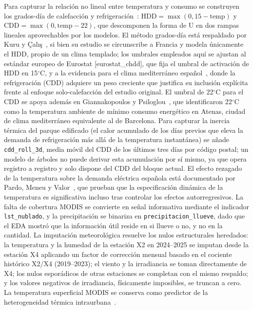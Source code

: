 \documentclass[12pt, a4paper]{article}
\begin{document}
Para capturar la relación no lineal entre temperatura y consumo se construyen los grados-día de calefacción y refrigeración~\cite{kuru2019}: $\text{HDD}=\max(0, 15-\text{temp})$ y $\text{CDD}=\max(0, \text{temp}-22)$, que descomponen la forma de U en dos rampas lineales aprovechables por los modelos. El método grados-día está respaldado por Kuru y Çalış~\cite{kuru2019}, si bien su estudio se circunscribe a Francia y modela únicamente el HDD, propio de un clima templado; los umbrales empleados aquí se ajustan al estándar europeo de Eurostat [eurostat\_chdd], que fija el umbral de activación de HDD en 15$^\circ$C, y a la evidencia para el clima mediterráneo español~\cite{cienciastecnologia2012}, donde la refrigeración (CDD) adquiere un peso creciente que justifica su inclusión explícita frente al enfoque solo-calefacción del estudio original. El umbral de 22$^\circ$C para el CDD se apoya además en Giannakopoulos y Psiloglou~\cite{giannakopoulos2006}, que identificaron 22$^\circ$C como la temperatura ambiente de mínimo consumo energético en Atenas, ciudad de clima mediterráneo equivalente al de Barcelona. Para capturar la inercia térmica del parque edificado (el calor acumulado de los días previos que eleva la demanda de refrigeración más allá de la temperatura instantánea) se añade \texttt{cdd\_roll\_3d}, media móvil del CDD de los últimos tres días por código postal; un modelo de árboles no puede derivar esta acumulación por sí mismo, ya que opera registro a registro y solo dispone del CDD del bloque actual. El efecto rezagado de la temperatura sobre la demanda eléctrica española está documentado por Pardo, Meneu y Valor~\cite{pardo2002}, que prueban que la especificación dinámica de la temperatura es significativa incluso tras controlar los efectos autorregresivos. La falta de cobertura MODIS se convierte en señal informativa mediante el indicador \texttt{lst\_nublado}, y la precipitación se binariza en \texttt{precipitacion\_llueve}, dado que el EDA mostró que la información útil reside en si llueve o no, y no en la cantidad. La imputación meteorológica resuelve los nulos estructurales heredados: la temperatura y la humedad de la estación X2 en 2024--2025 se imputan desde la estación X4 aplicando un factor de corrección mensual basado en el cociente histórico X2/X4 (2019--2023); el viento y la irradiancia se toman directamente de X4; los nulos esporádicos de otras estaciones se completan con el mismo respaldo; y los valores negativos de irradiancia, físicamente imposibles, se truncan a cero. La temperatura superficial MODIS se conserva como predictor de la heterogeneidad térmica intraurbana~\cite{salvati2017}.
\end{document}
